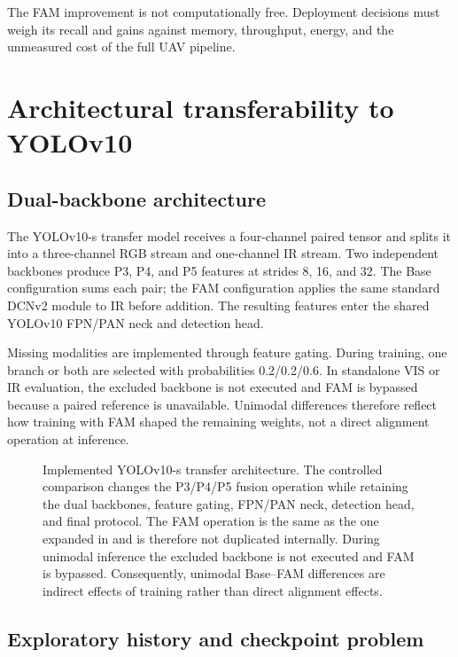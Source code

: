 The FAM improvement is not computationally free. Deployment decisions must
weigh its recall and \mapfifty{} gains against memory, throughput, energy, and
the unmeasured cost of the full UAV pipeline.

\section{Architectural transferability to YOLOv10}
\label{sec:yolo-transfer}

\subsection{Dual-backbone architecture}

The YOLOv10-s transfer model receives a four-channel paired tensor and splits
it into a three-channel RGB stream and one-channel IR stream. Two independent
backbones produce P3, P4, and P5 features at strides 8, 16, and 32. The
Base configuration sums each pair; the FAM configuration applies the same
standard DCNv2 module to IR before addition. The resulting features enter the
shared YOLOv10 FPN/PAN neck and detection head.

Missing modalities are implemented through feature gating. During training,
one branch or both are selected with probabilities 0.2/0.2/0.6. In standalone
VIS or IR evaluation, the excluded backbone is not executed and FAM is
bypassed because a paired reference is unavailable. Unimodal differences
therefore reflect how training with FAM shaped the remaining weights, not a
direct alignment operation at inference.

\begin{figure}[H]
  \centering
  \caption{Implemented YOLOv10-s transfer architecture. The controlled
  comparison changes the P3/P4/P5 fusion operation while retaining the dual
  backbones, feature gating, FPN/PAN neck, detection head, and final protocol.
  The FAM operation is the same as the one expanded in
   and is therefore not duplicated internally.
  During unimodal inference the excluded backbone is not executed and FAM is
  bypassed. Consequently, unimodal Base--FAM differences are indirect
  effects of training rather than direct alignment effects.}
  \label{fig:yolo-architecture}
\end{figure}

\subsection{Exploratory history and checkpoint problem}

